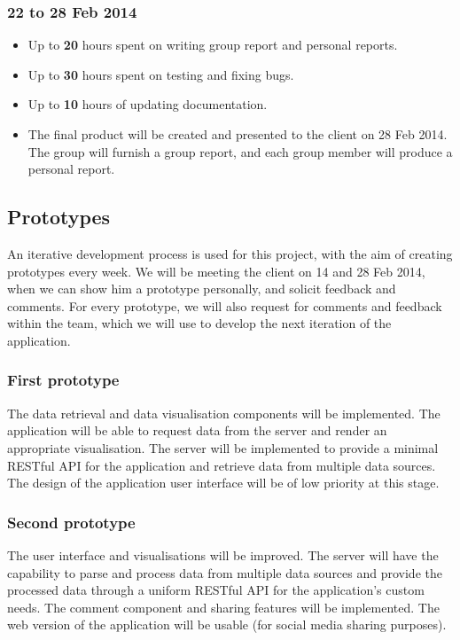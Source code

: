\documentclass[12pt,a4paper,twoside]{article}
\begin{document}
\subsubsection{22 to 28 Feb 2014}
\begin{itemize}
	\item Up to \textbf{20} hours spent on writing group report and personal reports.
	\item Up to \textbf{30} hours spent on testing and fixing bugs.
	\item Up to \textbf{10} hours of updating documentation.
	\item The final product will be created and presented to the client on 28 Feb 2014. The group will furnish a group report, and each group member will produce a personal report.
\end{itemize}

\subsection{Prototypes}
An iterative development process is used for this project, with the aim of creating prototypes every week. We will be meeting the client on 14 and 28 Feb 2014, when we can show him a prototype personally, and solicit feedback and comments. For every prototype, we will also request for comments and feedback within the team, which we will use to develop the next iteration of the application.

\subsubsection{First prototype}
The data retrieval and data visualisation components will be implemented. The application will be able to request data from the server and render an appropriate visualisation. The server will be implemented to provide a minimal RESTful API for the application
and retrieve data from multiple data sources. The design of the application user interface will be of low priority at this stage.

\subsubsection{Second prototype}
The user interface and visualisations will be improved. The server will have the capability to parse and process data from multiple data sources and provide the processed data through a uniform RESTful API for the application's custom needs. The comment component and sharing features will be implemented. The web version of the application will be usable (for social media sharing purposes).
\end{document}

